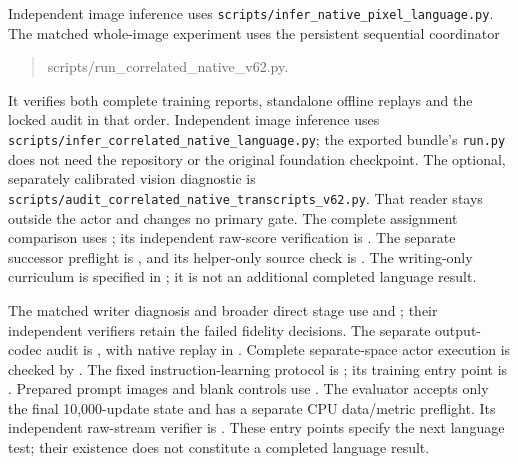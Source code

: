 \documentclass[10pt,a4paper]{article}
\begin{document}
Independent image inference uses
\texttt{scripts/infer\_native\_pixel\_language.py}.
The matched whole-image experiment uses the persistent sequential coordinator
\begin{quote}\small\ttfamily
scripts/run\_correlated\_native\_v62.py.
\end{quote}
It verifies both complete training reports, standalone offline replays and
the locked audit in that order. Independent image inference uses
\texttt{scripts/infer\_correlated\_native\_language.py};
the exported bundle's \texttt{run.py} does not need the repository or the
original foundation checkpoint. The optional, separately calibrated vision
diagnostic is \texttt{scripts/audit\_correlated\_native\_transcripts\_v62.py}.
That reader stays outside the actor and changes no primary gate.
The complete assignment comparison uses
; its independent raw-score
verification is .
The separate successor preflight is ,
and its helper-only source check is .
The writing-only curriculum is specified in
; it is not an
additional completed language result.

The matched writer diagnosis and broader direct stage use
 and
; their independent
verifiers retain the failed fidelity decisions. The separate output-codec
audit is , with native replay in
. Complete separate-space actor
execution is checked by .
The fixed instruction-learning protocol is
; its training entry
point is . Prepared prompt images
and blank controls use .
The evaluator  accepts only the final
10,000-update state and has a separate CPU data/metric preflight. Its
independent raw-stream verifier is .
These entry points specify the next language test; their existence does not
constitute a completed language result.


\end{document}
